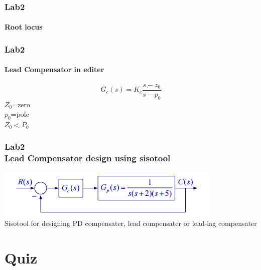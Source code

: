 \documentclass[hyperref={pdfpagelabels=true}]{beamer}
\begin{document}
\begin{frame}
\frametitle{Lab2}
\framesubtitle{Root locus }
\begin{tcolorbox}[title=code  ,width=9.85 cm]

\end{tcolorbox}
\end{frame}

\begin{frame}
\frametitle{Lab2}
\framesubtitle{Lead Compensator in editer }
$$G_c(s)=K_c\frac{s-z_0}{s-p_0}$$
$Z_0$=zero \\
$p_0$=pole \\
$Z_0 < P_0$ \\
\begin{tcolorbox}[title=code  ,width=9.85 cm]
 \tiny{

}
\end{tcolorbox}
\end{frame}


\begin{frame}
\frametitle{Lab2 \\{\large Lead Compensator design using sisotool}}
\centering
\includegraphics[scale = 0.55]{figs/Selection_042.png} \\
Sisotool for designing PD compensater, lead compensater or lead-lag compensater
\end{frame}





\section{Quiz}
\end{document}
